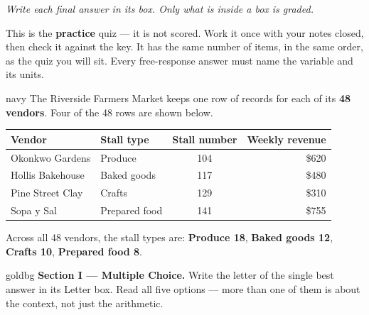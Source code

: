 \documentclass[12pt]{article}
\begin{document}
{\small\itshape Write each final answer in its box. Only what is inside a box is graded.}\par

\vspace{0.14in}

\boxguard[8]
\begin{remindbox}
\small
This is the \textbf{practice} quiz --- it is not scored. Work it once with your notes closed,
then check it against the key. It has the same number of items, in the same order, as the quiz
you will sit. Every free-response answer must name the variable and its units.
\end{remindbox}

\vspace{0.12in}

\boxguard[24]
\begin{scenariobox}{navy}
\small
The Riverside Farmers Market keeps one row of records for each of its \textbf{48 vendors}. Four
of the 48 rows are shown below.

\vspace{6pt}
\begin{center}
\renewcommand{\arraystretch}{1.2}
\begin{tabular}{@{} l l c r @{}}
\rowcolor{sky}
\textbf{Vendor} & \textbf{Stall type} & \textbf{Stall number} & \textbf{Weekly revenue} \\
\midrule
Okonkwo Gardens   & Produce        & 104 & \$620 \\
Hollis Bakehouse  & Baked goods    & 117 & \$480 \\
Pine Street Clay  & Crafts         & 129 & \$310 \\
Sopa y Sal        & Prepared food  & 141 & \$755 \\
\end{tabular}
\end{center}

\vspace{6pt}
Across all 48 vendors, the stall types are: \textbf{Produce 18}, \textbf{Baked goods 12},
\textbf{Crafts 10}, \textbf{Prepared food 8}.
\end{scenariobox}

\vspace{0.14in}

\boxguard[16]
\begin{headlinebox}{goldbg}
\small
\textbf{Section I --- Multiple Choice.} Write the letter of the single best answer in its Letter box. Read all five options ---
more than one of them is about the context, not just the arithmetic.
\end{headlinebox}
\end{document}
